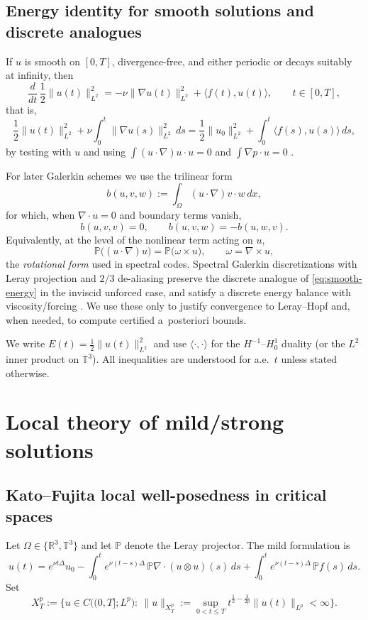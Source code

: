 \IfFileExists{nyjm.cls}{\documentclass[11pt]{nyjm}}{\documentclass[11pt]{amsart}}
\newcommand{\R}{\mathbb{R}}
\newcommand{\T}{\mathbb{T}}
\theoremstyle{plain}
\theoremstyle{definition}
\theoremstyle{remark}
\begin{document}
\subsection{Energy identity for smooth solutions and discrete analogues}\label{subsec:energy-identity}
If $u$ is smooth on $[0,T]$, divergence-free, and either periodic or decays suitably at infinity, then
\begin{equation}\label{eq:smooth-energy}
\frac{d}{dt}\,\frac12\|u(t)\|_{L^2}^2
= -\nu\|\nabla u(t)\|_{L^2}^2 + \langle f(t),u(t)\rangle,
\qquad t\in[0,T],
\end{equation}
that is,
\[
\frac12\|u(t)\|_{L^2}^2+\nu\!\int_0^t\!\|\nabla u(s)\|_{L^2}^2\,ds
=\frac12\|u_0\|_{L^2}^2+\int_0^t\!\langle f(s),u(s)\rangle\,ds,
\]
by testing with $u$ and using $\int (u\cdot\nabla)u\cdot u=0$ and $\int \nabla p\cdot u=0$ \cite[Ch.~III]{Temam2001}.

For later Galerkin schemes we use the trilinear form
\[
b(u,v,w):=\int_\Omega (u\cdot\nabla)v\cdot w\,dx,
\]
for which, when $\nabla\!\cdot u=0$ and boundary terms vanish,
\[
b(u,v,v)=0,\qquad b(u,v,w)=-b(u,w,v).
\]
Equivalently, at the level of the nonlinear term acting on $u$,
\[
\mathbb P\big((u\cdot\nabla)u\big)=\mathbb P\big(\omega\times u\big),\qquad \omega=\nabla\times u,
\]
the \emph{rotational form} used in spectral codes. Spectral Galerkin discretizations with Leray projection and $2/3$ de-aliasing preserve the discrete analogue of \eqref{eq:smooth-energy} in the inviscid unforced case, and satisfy a discrete energy balance with viscosity/forcing \cite{CanutoQuarteroniHussainiZang1988,Orszag1971}. We use these only to justify convergence to Leray--Hopf and, when needed, to compute certified a~posteriori bounds.

\medskip
We write $E(t)=\tfrac12\|u(t)\|_{L^2}^2$ and use $\langle\cdot,\cdot\rangle$ for the $H^{-1}$–$H^1_0$ duality (or the $L^2$ inner product on $\T^3$). All inequalities are understood for a.e.\ $t$ unless stated otherwise.


\section{Local theory of mild/strong solutions}\label{sec:local}

\subsection{Kato--Fujita local well-posedness in critical spaces}\label{subsec:kato-fujita}
Let $\Omega\in\{\R^3,\T^3\}$ and let $\mathbb P$ denote the Leray projector. The mild formulation is
\begin{equation}\label{eq:mild}
u(t)=e^{\nu t\Delta}u_0-\int_0^t e^{\nu(t-s)\Delta}\,\mathbb P\nabla\!\cdot(u\otimes u)(s)\,ds
+\int_0^t e^{\nu(t-s)\Delta}\,\mathbb P f(s)\,ds .
\end{equation}
Set
\[
X_T^{p}:=\Big\{u\in C\big((0,T];L^p\big):\ \|u\|_{X_T^{p}}:=\sup_{0<t\le T} t^{\frac12-\frac{3}{2p}}\|u(t)\|_{L^p}<\infty\Big\}.
\]
\end{document}
